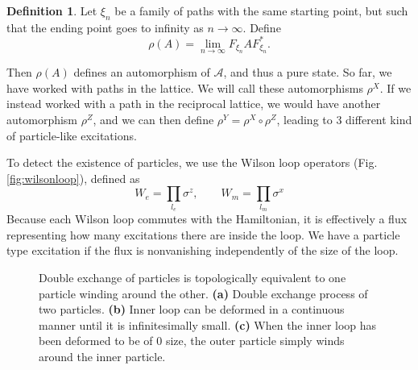 \documentclass[prb,11pt, nofootinbib]{revtex4-2}
\theoremstyle{definition}
\theoremstyle{definition}
\theoremstyle{definition}
\theoremstyle{definition}
\newtheorem{Definition}[Theorem]{Definition}
\newcommand{\note}[1]{{\color{red} {#1}}}
\renewcommand{\note}[1]{{}}
\begin{document}
\begin{Definition}
	Let $\xi_n$ be a family of paths with the same starting point, but such that the ending point goes to infinity as $n\to\infty$. Define
	\[\rho(A) = \lim_{n\to\infty} F_{\xi_n}AF_{\xi_n}^*.\]
\end{Definition}

Then $\rho(A)$ defines an automorphism of $\mathcal{A}$, and thus a pure state. So far, we have worked with paths in the lattice. We will call these automorphisms $\rho^X$. If we instead worked with a path in the reciprocal lattice\note{ draw!}, we would have another automorphism $\rho^Z$, and we can then define $\rho^Y=\rho^X\circ \rho^Z$, leading to 3 different kind of particle-like excitations.\note{ The $\rho^Y$ can be understood as a pair excitation.}

To detect the existence of particles, we use the Wilson loop operators (Fig. \ref{fig:wilsonloop}), defined as
\[W_e = \prod_{l_e}\sigma^z, \qquad W_m = \prod_{l_m}\sigma^x\]
Because each Wilson loop commutes with the Hamiltonian, it is effectively a flux representing how many excitations there are inside the loop. We have a particle type excitation if the flux is nonvanishing independently of the size of the loop.
\begin{figure}
\hspace{1cm}
\hspace{1cm}
\caption{Double exchange of particles is topologically equivalent to one particle winding around the other. \textbf{(a)} Double exchange process of two particles. \textbf{(b)} Inner loop can be deformed in a continuous manner until it is infinitesimally small. \textbf{(c)} When the inner loop has been deformed to be of 0 size, the outer particle simply winds around the inner particle.}
\label{fig:doubleswap}
\end{figure}
\end{document}
